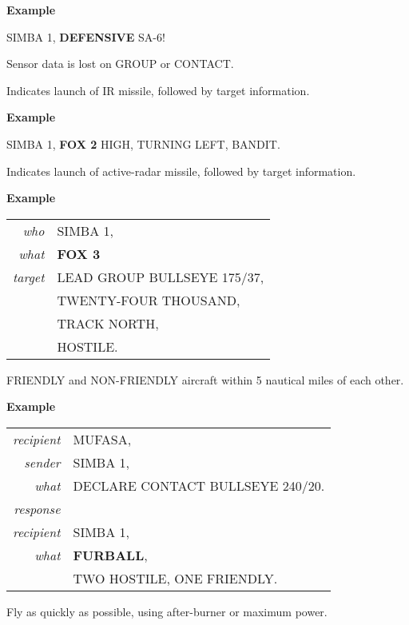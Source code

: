 \begin{tcoloritemize}
    \medskip
    \textbf{Example}
    \begin{center}
        \begin{minipage}{0.9\textwidth}
            SIMBA 1, \textbf{DEFENSIVE} SA-6!
        \end{minipage}
    \end{center}

    \blueitem[FADED] 
    Sensor data is lost on GROUP or CONTACT.

    \blueitem[FOX 2]
    Indicates launch of IR missile,
    followed by target information.

    \medskip
    \textbf{Example}
    \begin{center}
        \begin{minipage}{0.9\textwidth}
            SIMBA 1, \textbf{FOX 2} HIGH, TURNING LEFT, BANDIT.
        \end{minipage}
    \end{center}

    \blueitem[FOX 3]
    Indicates launch of active-radar missile,
    followed by target information.

    \medskip
    \textbf{Example}
    \begin{center}
        \begin{tabular}{>{\itshape}r l}
            who & SIMBA 1, \\
            what & \textbf{FOX 3} \\
            target & LEAD GROUP BULLSEYE 175/37, \\
            & TWENTY-FOUR THOUSAND, \\
            & TRACK NORTH, \\
            & HOSTILE. \\
        \end{tabular}
    \end{center}

    \blueitem[FURBALL]
    FRIENDLY and NON-FRIENDLY aircraft within 5 nautical miles of each other.

    \medskip
    \textbf{Example}
    \begin{center}
        \begin{tabular}{>{\itshape}r l}
            recipient & MUFASA, \\
            sender & SIMBA 1, \\
            what & DECLARE CONTACT BULLSEYE 240/20.\\
            response \\
            recipient & SIMBA 1, \\
            what & \textbf{FURBALL}, \\
            & TWO HOSTILE, ONE FRIENDLY.\\
        \end{tabular}
    \end{center}

    \blueitem[GATE]
    Fly as quickly as possible, using after-burner or
    maximum power.


\end{tcoloritemize}
